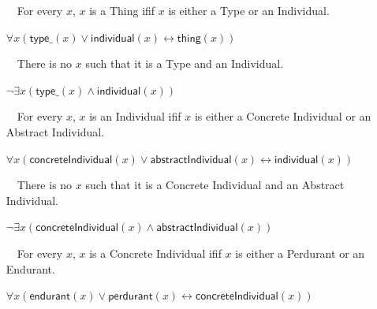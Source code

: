 \documentclass{article}
\newcommand{\AxLabel}{a}
\newcounter{cntax}
\newcommand{\myax}[1]{\refstepcounter{cntax}{\bf \small \AxLabel\thecntax}\label{#1}$\,\,\,\,$}
\newcommand{\me}[1]{\textsf{#1}}
\begin{document}
\begin{itemize}
    \item[\myax{ax_thing_taxonomy}] For every $x$, $x$ is a \me{Thing} ifif $x$ is either a \me{Type} or an \me{Individual}.
    
    $\forall x(\textsf{type\_}(x)\vee \textsf{individual}(x)\leftrightarrow \textsf{thing}(x))$
    
    
    
    
    \item[\myax{ax_thing_partition}] There is no $x$ such that it is a \me{Type} and an \me{Individual}.
    
    $\neg \exists x(\textsf{type\_}(x)\wedge \textsf{individual}(x))$
    
    


    \item[\myax{ax_individual_taxonomy}] For every $x$, $x$ is an \me{Individual} ifif $x$ is either a \me{Concrete Individual} or an \me{Abstract Individual}.
    
    $\forall x(\textsf{concreteIndividual}(x)\vee \textsf{abstractIndividual}(x)\leftrightarrow \textsf{individual}(x))$

    


    \item[\myax{ax_individual_partition}] There is no $x$ such that it is a \me{Concrete Individual} and an \me{Abstract Individual}.
    
    $\neg \exists x(\textsf{concreteIndividual}(x)\wedge \textsf{abstractIndividual}(x))$

    

    
    \item[\myax{ax_concreteIndividual_taxonomy}] For every $x$, $x$ is a \me{Concrete Individual} ifif $x$ is either a \me{Perdurant} or an \me{Endurant}.
    
    $\forall x(\textsf{endurant}(x)\vee \textsf{perdurant}(x)\leftrightarrow \textsf{concreteIndividual}(x))$

    



\end{itemize}
\end{document}
